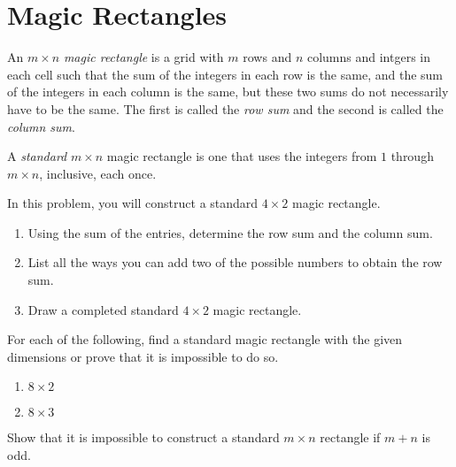 \documentclass[11pt]{article}
\renewenvironment{problem}{\begin{problems}}{\end{problems}\vspace{5pt}}
\begin{document}
\section{Magic Rectangles}

\begin{definition}
An $m \times n$ \textit{magic rectangle} is a grid with $m$ rows and $n$ columns and intgers in each cell such that
the sum of the integers in each row is the same, and the sum of the integers in each column is the same,
but these two sums do not necessarily have to be the same.
The first is called the \textit{row sum} and the second is called the \textit{column sum}.
\end{definition}

\begin{definition}
A \textit{standard} $m \times n$ magic rectangle is one that uses the integers from $1$ through $m\times n$, inclusive, each once.
\end{definition}

\begin{problem}[8=2+2+4 points]
In this problem, you will construct a standard $4 \times 2$ magic rectangle.
\begin{enumerate}[label=(\alph*)]
\item Using the sum of the entries, determine the row sum and the column sum.

\item List all the ways you can add two of the possible numbers to obtain the row sum.

\item Draw a completed standard $4 \times 2$ magic rectangle.
\end{enumerate}
\end{problem}

\begin{problem}[8=4+4 points]
For each of the following, find a standard magic rectangle with the given dimensions or prove that it is impossible to do so.
\begin{enumerate}[label=(\alph*)]
\item $8 \times 2$

\item $8 \times 3$
\end{enumerate}
\end{problem}

\begin{problem}[6 points]
Show that it is impossible to construct a standard $m \times n$ rectangle if $m+n$ is odd.
\end{problem}
\end{document}
